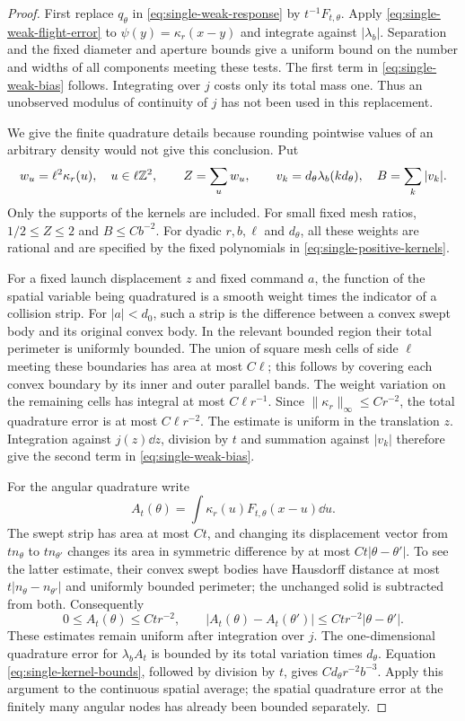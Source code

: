 \begin{proof}
First replace $q_\theta$ in \eqref{eq:single-weak-response} by
$t^{-1}F_{t,\theta}$.  Apply
\eqref{eq:single-weak-flight-error} to
$\psi(y)=\kappa_r(x-y)$ and integrate against $|\lambda_b|$.
Separation and the fixed diameter and aperture bounds give a uniform
bound on the number and widths of all components meeting these tests.
The first term in \eqref{eq:single-weak-bias} follows.  Integrating
over $j$ costs only its total mass one.  Thus an unobserved modulus
of continuity of $j$ has not been used in this replacement.

We give the finite quadrature details because rounding pointwise
values of an arbitrary density would not give this conclusion.  Put
\[
 w_u=\ell^2\kappa_r(u),\quad u\in\ell\mathbb Z^2,\qquad
 Z=\sum_u w_u,
 \qquad v_k=d_\theta\lambda_b(kd_\theta),\quad B=\sum_k|v_k|.
\]
Only the supports of the kernels are included.  For small fixed mesh
ratios, $1/2\le Z\le2$ and $B\le Cb^{-2}$.  For dyadic $r,b,\ell$
and $d_\theta$, all these weights are rational and are specified by
the fixed polynomials in \eqref{eq:single-positive-kernels}.

For a fixed launch displacement $z$ and fixed command $a$, the
function of the spatial variable being quadratured is a smooth weight
times the indicator of a collision strip.  For $|a|<d_0$, such a
strip is the difference between a convex swept body and its original
convex body.  In the relevant bounded region their total perimeter
is uniformly bounded.  The union of square mesh cells of side $\ell$
meeting these boundaries has area at most $C\ell$; this follows by
covering each convex boundary by its inner and outer parallel bands.
The weight variation on the remaining cells has integral at most
$C\ell r^{-1}$.  Since $\|\kappa_r\|_\infty\le Cr^{-2}$, the total
quadrature error is at most $C\ell r^{-2}$.  The estimate is uniform
in the translation $z$.  Integration against $j(z)\dd z$, division
by $t$ and summation against $|v_k|$ therefore give the second term
in \eqref{eq:single-weak-bias}.

For the angular quadrature write
\[
 A_t(\theta)=\int\kappa_r(u)F_{t,\theta}(x-u)\dd u.
\]
The swept strip has area at most $Ct$, and changing its displacement
vector from $t n_\theta$ to $t n_{\theta'}$ changes its area in
symmetric difference by at most $Ct|\theta-\theta'|$.  To see the
latter estimate, their convex swept bodies have Hausdorff distance
at most $t|n_\theta-n_{\theta'}|$ and uniformly bounded perimeter;
the unchanged solid is subtracted from both.  Consequently
\[
 0\le A_t(\theta)\le Ct r^{-2},\qquad
 |A_t(\theta)-A_t(\theta')|
                    \le Ct r^{-2}|\theta-\theta'|.
\]
These estimates remain uniform after integration over $j$.  The
one-dimensional quadrature error for $\lambda_b A_t$ is bounded by
its total variation times $d_\theta$.  Equation
\eqref{eq:single-kernel-bounds}, followed by division by $t$, gives
$Cd_\theta r^{-2}b^{-3}$.  Apply this argument to the continuous
spatial average; the spatial quadrature error at the finitely many
angular nodes has already been bounded separately.


\end{proof}
